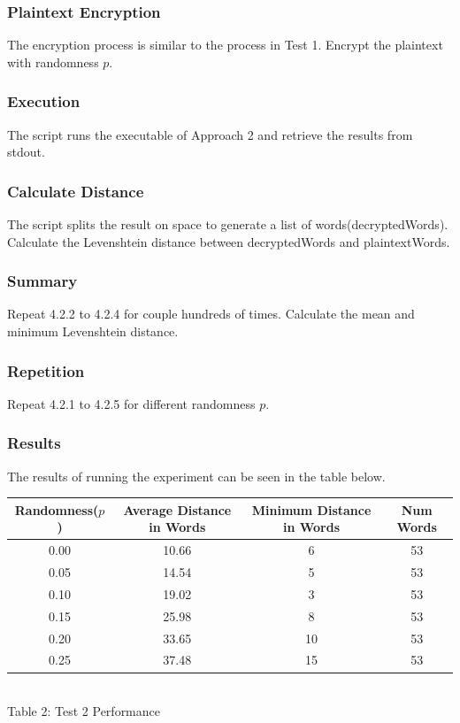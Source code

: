 \documentclass[12pt]{article}
\begin{document}
\subsubsection{Plaintext Encryption}
The encryption process is similar to the process in Test 1. Encrypt the plaintext with randomness $p$.
\subsubsection{Execution}
The script runs the executable of Approach 2 and retrieve the results from stdout.
\subsubsection{Calculate Distance}
The script splits the result on space to generate a list of words(decryptedWords). Calculate the Levenshtein distance between decryptedWords and plaintextWords.
\subsubsection{Summary}
Repeat 4.2.2 to 4.2.4 for couple hundreds of times. Calculate the mean and minimum Levenshtein distance.
\subsubsection{Repetition}
Repeat 4.2.1 to 4.2.5 for different randomness $p$. \\

\subsubsection{Results}
The results of running the experiment can be seen in the table below.

\begin{center}
\begin{tabular}{|c|c|c|c|} 
 \hline
 Randomness($p$) & Average Distance in Words & Minimum Distance in Words & Num Words \\ [0.5ex] 
 \hline\hline
 0.00 & 10.66 & 6 & 53 \\ 
 \hline
 0.05 & 14.54 & 5 & 53 \\
 \hline
 0.10 & 19.02 & 3 & 53 \\
 \hline
 0.15 & 25.98 & 8 & 53 \\
 \hline
 0.20 & 33.65 & 10 & 53 \\
 \hline
 0.25 & 37.48 & 15 & 53 \\
 \hline
\end{tabular} \\
    \vspace{0.15in}
Table 2: Test 2 Performance
\end{center}
\end{document}

